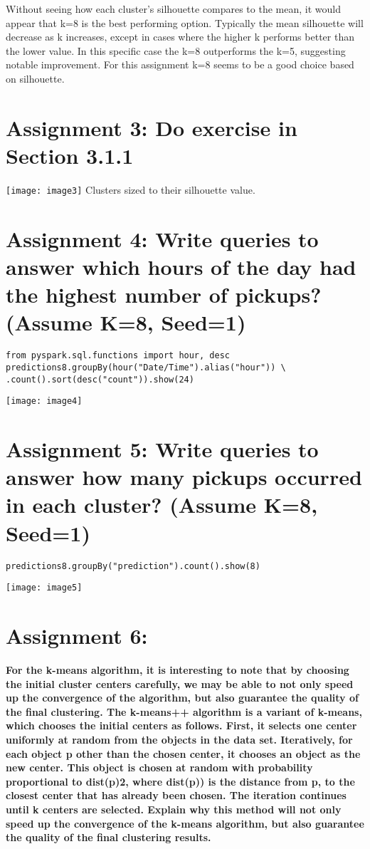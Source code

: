 \documentclass[]{article}
\begin{document}
Without seeing how each cluster's silhouette compares to the mean, it would appear that k=8 is the best performing option. 
Typically the mean silhouette will decrease as k increases, except in cases where the higher k performs better than the lower value. 
In this specific case the k=8 outperforms the k=5, suggesting notable improvement.
For this assignment k=8 seems to be a good choice based on silhouette.

\section*{Assignment 3: Do exercise in Section 3.1.1}

\texttt{[image: image3]}
Clusters sized to their silhouette value.

\section*{Assignment 4: Write queries to answer which hours of the day had the highest number of pickups? (Assume K=8, Seed=1)}

\begin{verbatim}
from pyspark.sql.functions import hour, desc
predictions8.groupBy(hour("Date/Time").alias("hour")) \
.count().sort(desc("count")).show(24)
\end{verbatim}
\texttt{[image: image4]}

\section*{Assignment 5: Write queries to answer how many pickups occurred in each cluster? (Assume K=8, Seed=1)}

\begin{verbatim}
predictions8.groupBy("prediction").count().show(8)
\end{verbatim}
\texttt{[image: image5]}

\section*{Assignment 6:}
\textbf{
For the k-means algorithm, it is interesting to note that by choosing the initial cluster centers 
carefully, we may be able to not only speed up the convergence of the algorithm, but also 
guarantee the quality of the final clustering. The k-means++ algorithm is a variant of k-means, 
which chooses the initial centers as follows. First, it selects one center uniformly at random from 
the objects in the data set. Iteratively, for each object p other than the chosen center, it chooses 
an object as the new center. This object is chosen at random with probability proportional to 
dist(p)2, where dist(p)) is the distance from p, to the closest center that has already been chosen. 
The iteration continues until k centers are selected.
Explain why this method will not only speed up the convergence of the k-means algorithm, but 
also guarantee the quality of the final clustering results.
}
\end{document}

